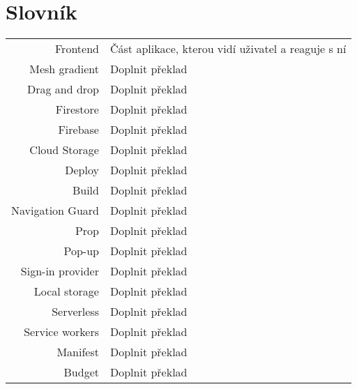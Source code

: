 
\chapter{Slovník}

\begin{tabular}{rl}
    Frontend & Část aplikace, kterou vidí uživatel a reaguje s ní \\
    Mesh gradient & Doplnit překlad \\ %
    Drag and drop & Doplnit překlad \\ %
    Firestore & Doplnit překlad \\ %
    Firebase & Doplnit překlad \\ %
    Cloud Storage & Doplnit překlad \\ %
    Deploy & Doplnit překlad \\ %
    Build & Doplnit překlad \\ %
    Navigation Guard & Doplnit překlad \\ %
    Prop & Doplnit překlad \\ %
    Pop-up & Doplnit překlad \\ %
    Sign-in provider & Doplnit překlad \\ %
    Local storage & Doplnit překlad \\ %
    Serverless & Doplnit překlad \\ %
    Service workers & Doplnit překlad \\ %
    Manifest & Doplnit překlad \\ %
    Budget & Doplnit překlad \\ %
\end{tabular}
